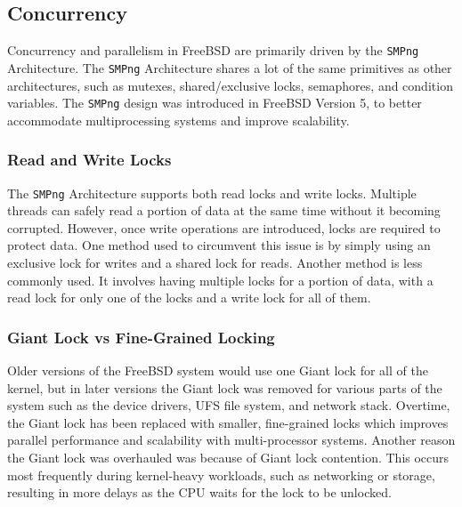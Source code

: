 \documentclass[12pt, dvipsnames, a4paper]{article}
\newcommand{\code}[1]{\texttt{#1}}
\begin{document}
\subsection{Concurrency}
Concurrency and parallelism in FreeBSD are primarily driven by the \code{SMPng} Architecture. The \code{SMPng} Architecture shares a lot of the same primitives as other architectures, such as mutexes, shared/exclusive locks, semaphores, and condition variables. The \code{SMPng} design was introduced in FreeBSD Version 5, to better accommodate multiprocessing systems and improve scalability.

\subsubsection{Read and Write Locks}
The \code{SMPng} Architecture supports both read locks and write locks. Multiple threads can safely read a portion of data at the same time without it becoming corrupted. However, once write operations are introduced, locks are required to protect data. One method used to circumvent this issue is by simply using an exclusive lock for writes and a shared lock for reads. Another method is less commonly used. It involves having multiple locks for a portion of data, with a read lock for only one of the locks and a write lock for all of them.

\subsubsection{Giant Lock vs Fine-Grained Locking}
Older versions of the FreeBSD system would use one Giant lock for all of the kernel, but in later versions the Giant lock was removed for various parts of the system such as the device drivers, UFS file system, and network stack. Overtime, the Giant lock has been replaced with smaller, fine-grained locks which improves parallel performance and scalability with multi-processor systems. Another reason the Giant lock was overhauled was because of Giant lock contention. This occurs most frequently during kernel-heavy workloads, such as networking or storage, resulting in more delays as the CPU waits for the lock to be unlocked.
\end{document}
